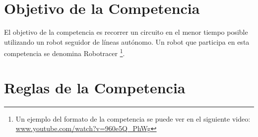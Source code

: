 \pagebreak

\section{Objetivo de la Competencia}

El objetivo de la competencia es recorrer un circuito en el menor tiempo posible utilizando un robot seguidor de líneas autónomo. Un robot que participa en esta competencia se denomina Robotracer \footnote{Un ejemplo del formato de la competencia se puede ver en el siguiente video: \href{https://www.youtube.com/watch?v=960e5Q_PhWg}{www.youtube.com/watch?v=960e5Q\_PhWg}}.

\section{Reglas de la Competencia}

